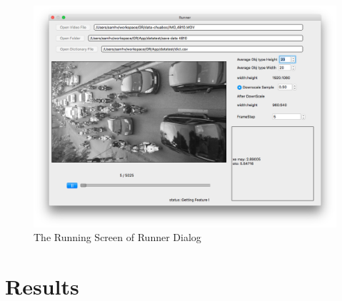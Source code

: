 \begin{center}
  \begin{figure}[H]
    \includegraphics[width=\textwidth]{Chapters/Fig/Running}
    \caption{The Running Screen of Runner Dialog}
    \label{fig:running}
\end{figure}
\end{center}

\section{Results}
